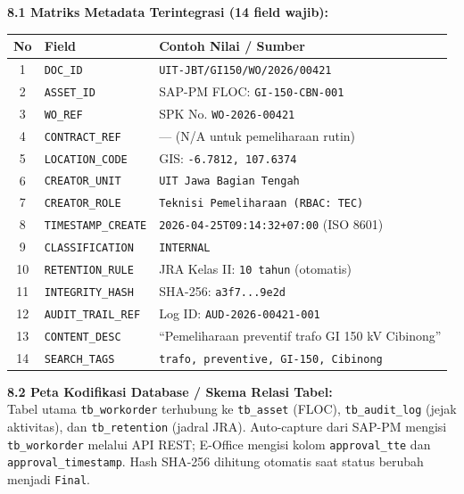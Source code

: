 \documentclass[12pt,a4paper]{report}
\begin{document}
\begin{tcolorbox}[colback=fillgreen, colframe=plnblue!50, sharp corners, title={\small\bfseries Komponen 8: Lampiran Teknis (Matriks Metadata, Peta DB, \& Audit Trail)}]
\small
\noindent\textbf{8.1 Matriks Metadata Terintegrasi (14 field wajib):}\\[0.15cm]
\scriptsize
\renewcommand{\arraystretch}{1.15}
\begin{tabularx}{\textwidth}{@{} c X X @{}}
\toprule
\textbf{No} & \textbf{Field} & \textbf{Contoh Nilai / Sumber} \\
\midrule
1 & \texttt{DOC\_ID} & \texttt{UIT-JBT/GI150/WO/2026/00421} \\
2 & \texttt{ASSET\_ID} & SAP-PM FLOC: \texttt{GI-150-CBN-001} \\
3 & \texttt{WO\_REF} & SPK No. \texttt{WO-2026-00421} \\
4 & \texttt{CONTRACT\_REF} & --- (N/A untuk pemeliharaan rutin) \\
5 & \texttt{LOCATION\_CODE} & GIS: \texttt{-6.7812, 107.6374} \\
6 & \texttt{CREATOR\_UNIT} & \texttt{UIT Jawa Bagian Tengah} \\
7 & \texttt{CREATOR\_ROLE} & \texttt{Teknisi Pemeliharaan (RBAC: TEC)} \\
8 & \texttt{TIMESTAMP\_CREATE} & \texttt{2026-04-25T09:14:32+07:00} (ISO 8601) \\
9 & \texttt{CLASSIFICATION} & \texttt{INTERNAL} \\
10 & \texttt{RETENTION\_RULE} & JRA Kelas II: \texttt{10 tahun} (otomatis) \\
11 & \texttt{INTEGRITY\_HASH} & SHA-256: \texttt{a3f7...9e2d} \\
12 & \texttt{AUDIT\_TRAIL\_REF} & Log ID: \texttt{AUD-2026-00421-001} \\
13 & \texttt{CONTENT\_DESC} & ``Pemeliharaan preventif trafo GI 150 kV Cibinong'' \\
14 & \texttt{SEARCH\_TAGS} & \texttt{trafo, preventive, GI-150, Cibinong} \\
\bottomrule
\end{tabularx}
\renewcommand{\arraystretch}{1.0}

\vspace{0.3cm}
\normalsize
\noindent\textbf{8.2 Peta Kodifikasi Database / Skema Relasi Tabel:}\\
\small
Tabel utama \texttt{tb\_workorder} terhubung ke \texttt{tb\_asset} (FLOC), \texttt{tb\_audit\_log} (jejak aktivitas), dan \texttt{tb\_retention} (jadral JRA). Auto-capture dari SAP-PM mengisi \texttt{tb\_workorder} melalui API REST; E-Office mengisi kolom \texttt{approval\_tte} dan \texttt{approval\_timestamp}. Hash SHA-256 dihitung otomatis saat status berubah menjadi \texttt{Final}.


\end{tcolorbox}
\end{document}
